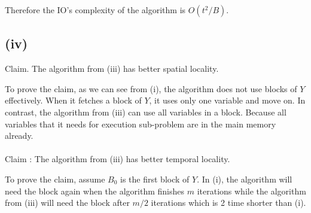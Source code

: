 Therefore the IO's complexity of the algorithm is $O(t^2/B)$.

\subsection*{(iv)}

Claim. The algorithm from (iii) has better spatial locality.

To prove the claim, as we can see from (i), the algorithm does not use blocks of $Y$ effectively. When it fetches a block of $Y$, it uses only one variable and move on. In contrast, the algorithm from (iii) can use all variables in a block. Because all variables that it needs for execution sub-problem are in the main memory already.
\\\\
Claim : The algorithm from (iii) has better temporal locality. 

To prove the claim, assume $B_0$ is the first block of $Y$. In (i), the algorithm will need the block again when the algorithm finishes $m$ iterations while the algorithm from (iii) will need the block after $m/2$ iterations which is 2 time shorter than (i).
